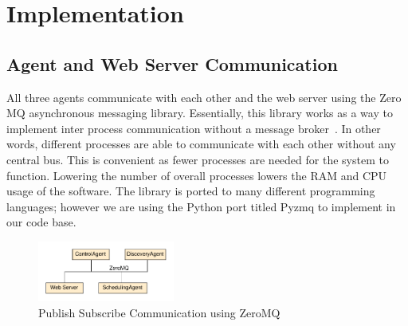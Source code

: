 \chapter{Implementation}
\label{ch: Chapter3}

\section{Agent and Web Server Communication}

All three agents communicate with each other and the web server using the Zero
MQ asynchronous messaging library. Essentially, this library
works as a way to implement inter process communication without a message
broker~\cite{zeromq}. In other words, different processes are able to communicate with each
other without any central bus. This is convenient as fewer processes are needed
for the system to function. Lowering the number of overall processes lowers the
RAM and CPU usage of the software. The library is ported to many different
programming languages; however we are using the Python port titled Pyzmq to
implement in our code base.
%
\begin{figure}
    \centering
    \includegraphics[width=0.4\textwidth]{figs/agents/pubSubAgents.pdf}
    \caption{Publish Subscribe Communication using ZeroMQ}
    \label{fig:pubSubAgents}
\end{figure}


